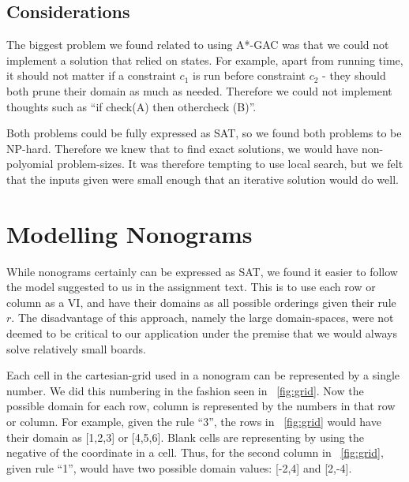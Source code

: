 \documentclass[journal]{IEEEtran}
\begin{document}
\subsection*{Considerations}
The biggest problem we found related to using A*-GAC was that we could not
implement a solution that relied on states.
For example, apart from running time, it should not matter if a constraint
$c_1$  is run before constraint $c_2$ - they should both prune their domain as
much as needed. Therefore we could not implement thoughts such as
``if check(A) then othercheck (B)''.

Both problems could be fully expressed as SAT, so we found both problems to
be NP-hard. Therefore we knew that to find exact solutions, we would have
non-polyomial problem-sizes. It was therefore tempting to use local search,
but we felt that the inputs given were small enough that an iterative solution
would do well.

\section*{Modelling Nonograms}
While nonograms certainly can be expressed as SAT, we found it easier to
follow the model suggested to us in the assignment text. This is 
to use each row or column as a VI, and have their domains as all possible
orderings given their rule $r$. The disadvantage of this approach, namely the large domain-spaces, were not deemed
to be critical to our application under the premise that we would always solve
relatively small boards.

Each cell in the cartesian-grid used in a nonogram can be represented by a single number.
We did this numbering in the fashion seen in ~\autoref{fig:grid}.
Now the possible domain for each row, column is represented by the numbers
in that row or column. For example, given the rule ``3'', the rows in  ~\autoref{fig:grid} would
have their domain as [1,2,3] or [4,5,6].
Blank cells are representing by using the negative of the coordinate in a cell.
Thus, for the second column in ~\autoref{fig:grid}, given rule ``1'', would have
two possible domain values: [-2,4] and [2,-4].
\end{document}
